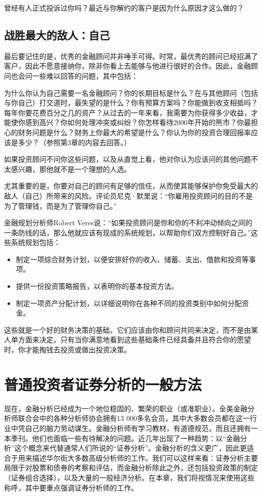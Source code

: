 \documentclass[12pt,oneside]{book}
\begin{document}
曾经有人正式投诉过你吗？最近与你解约的客户是因为什么原因才这么做的？

\subsection{战胜最大的敌人：自己}
最后要记住的是，优秀的金融顾问并非唾手可得。时常，最优秀的顾问已经招满了客户，因此不愿意接纳你，除非你看上去能够与他进行很好的合作。因此，金融顾问也会问一些难以回答的问题，其中包括：

为什么你认为自己需要一名金融顾问？你的长期目标是什么？在与其他顾问（包括与你自己）打交道时，最失望的是什么？你有预算方案吗？你能做到收支相抵吗？每年你要花费百分之几的资产？从过去的一年来看，我需要为你获得多少收益，才能使你感到高兴？你如何处理冲突或纠纷？你怎样看待2000年开始的熊市？你最担心的财务问题是什么？财务上你最大的希望是什么？你认为你的投资合理回报率应该是多少？（参照第3章的内容去回答。）

如果投资顾问不问你这些问题，以及从直觉上看，他对你认为应该问的其他问题不太感兴趣，那他就不是一个理想的人选。

尤其重要的是，你要对自己的顾问有足够的信任，从而使其能够保护你免受最大的敌人（自己）所带来的风险。评论员尼克·默里说：“你雇用投资顾问的目的不是为了管理钱，而是为了管理你自己。”

金融规划分析师Robert Veres说：“如果投资顾问是你和你的不利冲动倾向之间的一条防线的话，那么他就应该有现成的系统规划，以帮助你们双方控制好自己。”这些系统规划包括：

\begin{itemize}
\item 制定一项综合财务计划，以便安排好你的收入、储蓄、支出、借款和投资等事项。
\item 提供一份投资策略报告，以表明你的基本投资方法。
\item 制定一项资产分配计划，以详细说明你在各种不同的投资类别中如何分配资金。
\end{itemize}


这些就是一个好的财务决策的基础，它们应该由你和顾问共同来决定，而不是由某人单方面来决定。只有当你满意地看到这些基础条件已经具备并且符合你的愿望时，你才能掏钱去投资或做出投资决策。

\section{普通投资者证券分析的一般方法}
现在，金融分析已经成为一个地位稳固的、繁荣的职业（或准职业）。全美金融分析师联合会中的各种分析师协会拥有13 000多名会员，其中大多数会员都在这一行业中凭自己的脑力劳动谋生。金融分析师有学习教材，有道德规范，而且还拥有一本季刊。他们也面临一些有待解决的问题。近几年出现了一种趋势：以“金融分析”这个概念来代替通常人们所说的“证券分析”。金融分析的含义更广，因此更适合于用来描述华尔街大多数高级分析师的工作。我们可以这样来看：证券分析主要局限于对股票和债券的考察和评估，而金融分析除此之外，还包括投资政策的制定（证券组合选择），以及大量的一般经济分析。在本章，我们将视情况来使用这些称呼，其中要重点强调证券分析师的工作。
\end{document}

